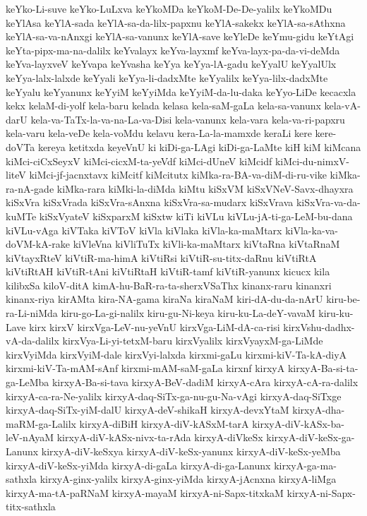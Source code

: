 {keYko-Li-suve
keYko-LuLxva
keYkoMDa
keYkoM-De-De-yalilx
keYkoMDu
keYlAsa
keYlA-sada
keYlA-sa-da-lilx-papxnu
keYlA-sakekx
keYlA-sa-sAthxna
keYlA-sa-va-nAnxgi
keYlA-sa-vanunx
keYlA-save
keYleDe
keYmu-gidu
keYtAgi
keYta-pipx-ma-na-dalilx
keYvalayx
keYva-layxmf
keYva-layx-pa-da-vi-deMda
keYva-layxveV
keYvapa
keYvasha
keYya
keYya-lA-gadu
keYyalU
keYyalUlx
keYya-lalx-lalxde
keYyali
keYya-li-dadxMte
keYyalilx
keYya-lilx-dadxMte
keYyalu
keYyanunx
keYyiM
keYyiMda
keYyiM-da-lu-daka
keYyo-LiDe
kecacxla
kekx
kelaM-di-yolf
kela-baru
kelada
kelasa
kela-saM-gaLa
kela-sa-vanunx
kela-vA-darU
kela-va-TaTx-la-va-na-La-va-Disi
kela-vanunx
kela-vara
kela-va-ri-papxru
kela-varu
kela-veDe
kela-voMdu
kelavu
kera-La-la-mamxde
keraLi
kere
kere-doVTa
kereya
ketitxda
keyeVnU
ki
kiDi-ga-LAgi
kiDi-ga-LaMte
kiH
kiM
kiMcana
kiMci-ciCxSeyxV
kiMci-cicxM-ta-yeVdf
kiMci-dUneV
kiMcidf
kiMci-du-nimxV-liteV
kiMci-jf-jacnxtavx
kiMcitf
kiMcitutx
kiMka-ra-BA-va-diM-di-ru-vike
kiMka-ra-nA-gade
kiMka-rara
kiMki-la-diMda
kiMtu
kiSxVM
kiSxVNeV-Savx-dhayxra
kiSxVra
kiSxVrada
kiSxVra-sAnxna
kiSxVra-sa-mudarx
kiSxVrava
kiSxVra-va-da-kuMTe
kiSxVyateV
kiSxparxM
kiSxtw
kiTi
kiVLu
kiVLu-jA-ti-ga-LeM-bu-dana
kiVLu-vAga
kiVTaka
kiVToV
kiVla
kiVlaka
kiVla-ka-maMtarx
kiVla-ka-va-doVM-kA-rake
kiVleVna
kiVliTuTx
kiVli-ka-maMtarx
kiVtaRna
kiVtaRnaM
kiVtayxRteV
kiVtiR-ma-himA
kiVtiRsi
kiVtiR-su-titx-daRnu
kiVtiRtA
kiVtiRtAH
kiVtiR-tAni
kiVtiRtaH
kiVtiR-tamf
kiVtiR-yanunx
kicucx
kila
kilibxSa
kiloV-ditA
kimA-hu-BaR-ra-ta-sherxVSaThx
kinanx-raru
kinanxri
kinanx-riya
kirAMta
kira-NA-gama
kiraNa
kiraNaM
kiri-dA-du-da-nArU
kiru-be-ra-Li-niMda
kiru-go-La-gi-nalilx
kiru-gu-Ni-keya
kiru-ku-La-deY-vavaM
kiru-ku-Lave
kirx
kirxV
kirxVga-LeV-nu-yeVnU
kirxVga-LiM-dA-ca-risi
kirxVshu-dadhx-vA-da-dalilx
kirxVya-Li-yi-tetxM-baru
kirxVyalilx
kirxVyayxM-ga-LiMde
kirxVyiMda
kirxVyiM-dale
kirxVyi-lalxda
kirxmi-gaLu
kirxmi-kiV-Ta-kA-diyA
kirxmi-kiV-Ta-mAM-sAnf
kirxmi-mAM-saM-gaLa
kirxnf
kirxyA
kirxyA-Ba-si-ta-ga-LeMba
kirxyA-Ba-si-tava
kirxyA-BeV-dadiM
kirxyA-cAra
kirxyA-cA-ra-dalilx
kirxyA-ca-ra-Ne-yalilx
kirxyA-daq-SiTx-ga-nu-gu-Na-vAgi
kirxyA-daq-SiTxge
kirxyA-daq-SiTx-yiM-dalU
kirxyA-deV-shikaH
kirxyA-devxYtaM
kirxyA-dha-maRM-ga-Lalilx
kirxyA-diBiH
kirxyA-diV-kASxM-tarA
kirxyA-diV-kASx-ba-leV-nAyaM
kirxyA-diV-kASx-nivx-ta-rAda
kirxyA-diVkeSx
kirxyA-diV-keSx-ga-Lanunx
kirxyA-diV-keSxya
kirxyA-diV-keSx-yanunx
kirxyA-diV-keSx-yeMba
kirxyA-diV-keSx-yiMda
kirxyA-di-gaLa
kirxyA-di-ga-Lanunx
kirxyA-ga-ma-sathxla
kirxyA-ginx-yalilx
kirxyA-ginx-yiMda
kirxyA-jAcnxna
kirxyA-liMga
kirxyA-ma-tA-paRNaM
kirxyA-mayaM
kirxyA-ni-Sapx-titxkaM
kirxyA-ni-Sapx-titx-sathxla
}
